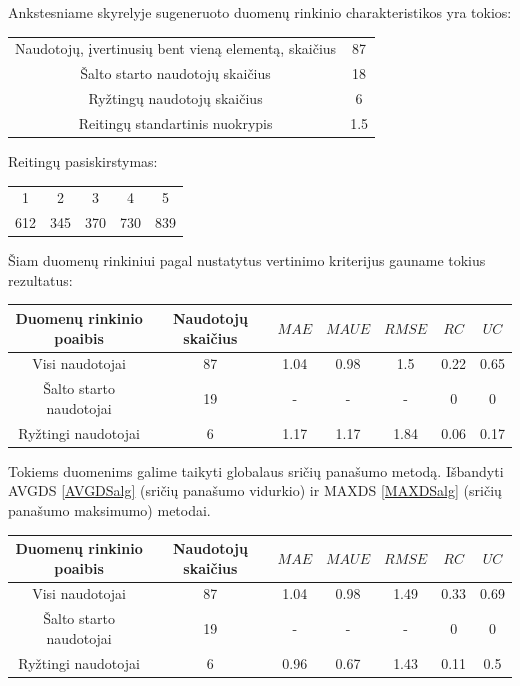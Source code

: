 \documentclass{VUMIFInfMagistrinis}
\begin{document}
Ankstesniame skyrelyje sugeneruoto duomenų rinkinio charakteristikos yra tokios:
\begin{center}
	\begin{tabular}{||c c||} 
		Naudotojų, įvertinusių bent vieną elementą, skaičius & 87 \\
		Šalto starto naudotojų skaičius & 18 \\
		Ryžtingų naudotojų skaičius  & 6 \\
		Reitingų standartinis nuokrypis & 1.5 \\
	\end{tabular}
\end{center}
Reitingų pasiskirstymas:
\begin{center}
	\begin{tabular}{||c c c c c||} 
		1 & 2 & 3 & 4 & 5 \\
		612 & 345 & 370 & 730 & 839 \\
	\end{tabular}
\end{center}
\indent
Šiam duomenų rinkiniui pagal nustatytus vertinimo kriterijus gauname tokius rezultatus:
\begin{center}
	\begin{tabular}{||c c c c c c c ||} 
		Duomenų rinkinio poaibis & Naudotojų skaičius & $MAE$ & $MAUE$ & $RMSE$ & $RC$ & $UC$ \\
		\hline
		Visi naudotojai & 87 & 1.04 & 0.98 & 1.5 & 0.22 & 0.65 \\
		\hline
		Šalto starto naudotojai & 19 & - & - & - & 0 & 0 \\
		\hline
		Ryžtingi naudotojai & 6 & 1.17 & 1.17 & 1.84 & 0.06 & 0.17 \\
	\end{tabular}
\end{center}

\indent
Tokiems duomenims galime taikyti globalaus sričių panašumo metodą. Išbandyti AVGDS \ref{AVGDSalg} (sričių panašumo vidurkio) ir MAXDS \ref{MAXDSalg} (sričių panašumo maksimumo) metodai.
\begin{center}
	\begin{tabular}{||c c c c c c c ||} 
		Duomenų rinkinio poaibis & Naudotojų skaičius & $MAE$ & $MAUE$ & $RMSE$ & $RC$ & $UC$ \\
		\hline
		Visi naudotojai & 87 & 1.04 & 0.98 & 1.49 & 0.33 & 0.69 \\
		\hline
		Šalto starto naudotojai & 19 & - & - & - & 0 & 0 \\
		\hline
		Ryžtingi naudotojai & 6 & 0.96 & 0.67 & 1.43 & 0.11 & 0.5 \\
	\end{tabular}
\end{center}
\end{document}
